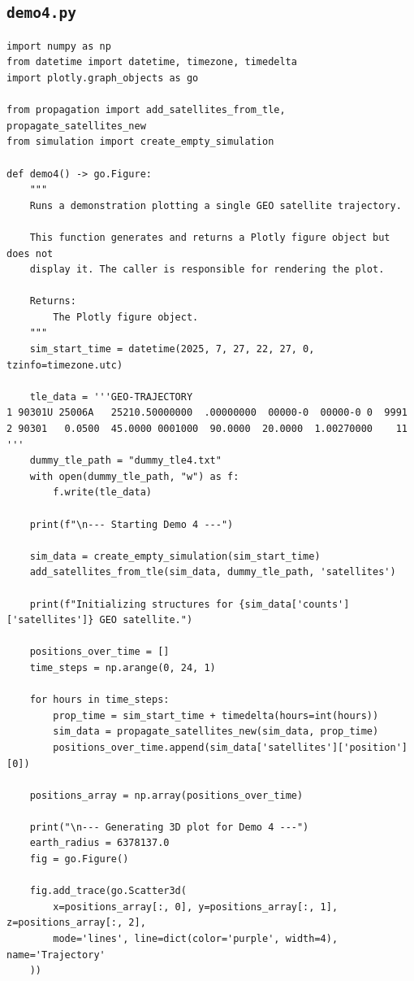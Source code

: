 \documentclass[11pt]{article}
\begin{document}
\subsection{\texttt{demo4.py}}
\begin{Verbatim}
import numpy as np
from datetime import datetime, timezone, timedelta
import plotly.graph_objects as go

from propagation import add_satellites_from_tle, propagate_satellites_new
from simulation import create_empty_simulation

def demo4() -> go.Figure:
    """
    Runs a demonstration plotting a single GEO satellite trajectory.

    This function generates and returns a Plotly figure object but does not
    display it. The caller is responsible for rendering the plot.

    Returns:
        The Plotly figure object.
    """
    sim_start_time = datetime(2025, 7, 27, 22, 27, 0, tzinfo=timezone.utc)

    tle_data = '''GEO-TRAJECTORY
1 90301U 25006A   25210.50000000  .00000000  00000-0  00000-0 0  9991
2 90301   0.0500  45.0000 0001000  90.0000  20.0000  1.00270000    11
'''
    dummy_tle_path = "dummy_tle4.txt"
    with open(dummy_tle_path, "w") as f:
        f.write(tle_data)

    print(f"\n--- Starting Demo 4 ---")

    sim_data = create_empty_simulation(sim_start_time)
    add_satellites_from_tle(sim_data, dummy_tle_path, 'satellites')

    print(f"Initializing structures for {sim_data['counts']['satellites']} GEO satellite.")

    positions_over_time = []
    time_steps = np.arange(0, 24, 1)

    for hours in time_steps:
        prop_time = sim_start_time + timedelta(hours=int(hours))
        sim_data = propagate_satellites_new(sim_data, prop_time)
        positions_over_time.append(sim_data['satellites']['position'][0])

    positions_array = np.array(positions_over_time)

    print("\n--- Generating 3D plot for Demo 4 ---")
    earth_radius = 6378137.0
    fig = go.Figure()

    fig.add_trace(go.Scatter3d(
        x=positions_array[:, 0], y=positions_array[:, 1], z=positions_array[:, 2],
        mode='lines', line=dict(color='purple', width=4), name='Trajectory'
    ))


\end{Verbatim}
\end{document}
